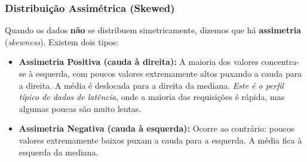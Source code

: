 \documentclass[12pt,a4paper,twoside]{report}
\begin{document}
\subsubsection{Distribuição Assimétrica (Skewed)}

Quando os dados \textbf{não} se distribuem simetricamente, dizemos que há \textbf{assimetria} (\textit{skewness}). Existem dois tipos:

\begin{itemize}[nosep]
    \item \textbf{Assimetria Positiva (cauda à direita):} A maioria dos valores concentra-se à esquerda, com poucos valores extremamente altos puxando a cauda para a direita. A média é deslocada para a direita da mediana. \emph{Este é o perfil típico de dados de latência}, onde a maioria das requisições é rápida, mas algumas poucas são muito lentas.
    \item \textbf{Assimetria Negativa (cauda à esquerda):} Ocorre ao contrário: poucos valores extremamente baixos puxam a cauda para a esquerda. A média fica à esquerda da mediana.
\end{itemize}
\end{document}
